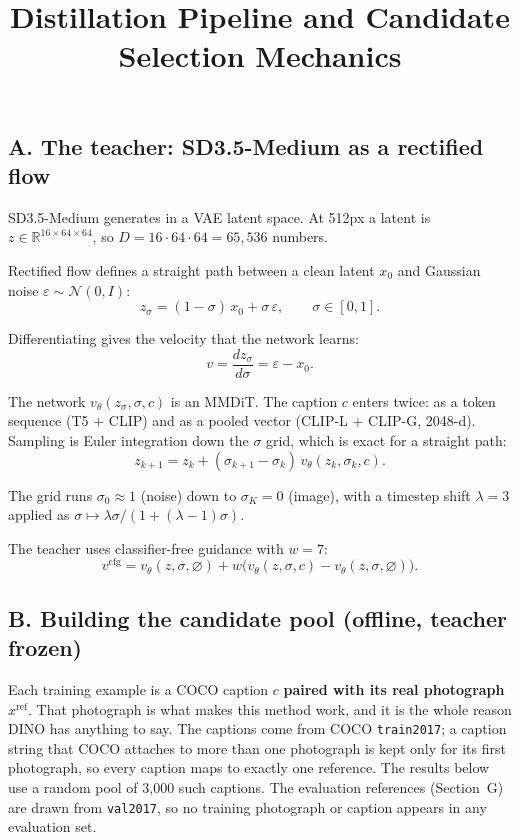 \documentclass[11pt,a4paper]{article}
\title{\textbf{Distillation Pipeline and Candidate Selection Mechanics}}
\date{}
\begin{document}
\maketitle

\subsection*{A. The teacher: SD3.5-Medium as a rectified flow}

SD3.5-Medium generates in a VAE latent space. At 512px a latent is $z \in \mathbb{R}^{16\times 64\times 64}$, so $D = 16\cdot 64\cdot 64 = 65{,}536$ numbers.

Rectified flow defines a straight path between a clean latent $x_0$ and Gaussian noise $\varepsilon \sim \mathcal{N}(0,I)$:
\begin{equation}
z_\sigma = (1-\sigma)\,x_0 + \sigma\,\varepsilon, \qquad \sigma \in [0,1].
\end{equation}

Differentiating gives the velocity that the network learns:
\begin{equation}
v = \frac{dz_\sigma}{d\sigma} = \varepsilon - x_0.
\end{equation}

The network $v_\theta(z_\sigma, \sigma, c)$ is an MMDiT. The caption $c$ enters twice: as a token sequence (T5 + CLIP) and as a pooled vector (CLIP-L + CLIP-G, 2048-d). Sampling is Euler integration down the $\sigma$ grid, which is exact for a straight path:
\begin{equation}
z_{k+1} = z_k + (\sigma_{k+1} - \sigma_k)\, v_\theta(z_k, \sigma_k, c).
\end{equation}

The grid runs $\sigma_0 \approx 1$ (noise) down to $\sigma_K = 0$ (image), with a timestep shift $\lambda = 3$ applied as $\sigma \mapsto \lambda\sigma / (1 + (\lambda-1)\sigma)$.

The teacher uses classifier-free guidance with $w = 7$:
\begin{equation}
v^{\text{cfg}} = v_\theta(z,\sigma,\varnothing) + w\big(v_\theta(z,\sigma,c) - v_\theta(z,\sigma,\varnothing)\big).
\end{equation}

\subsection*{B. Building the candidate pool (offline, teacher frozen)}

Each training example is a COCO caption $c$ \textbf{paired with its real photograph} $x^{\text{ref}}$. That photograph is what makes this method work, and it is the whole reason DINO has anything to say. The captions come from COCO \texttt{train2017}; a caption string that COCO attaches to more than one photograph is kept only for its first photograph, so every caption maps to exactly one reference. The results below use a random pool of 3{,}000 such captions. The evaluation references (Section~G) are drawn from \texttt{val2017}, so no training photograph or caption appears in any evaluation set.
\end{document}
